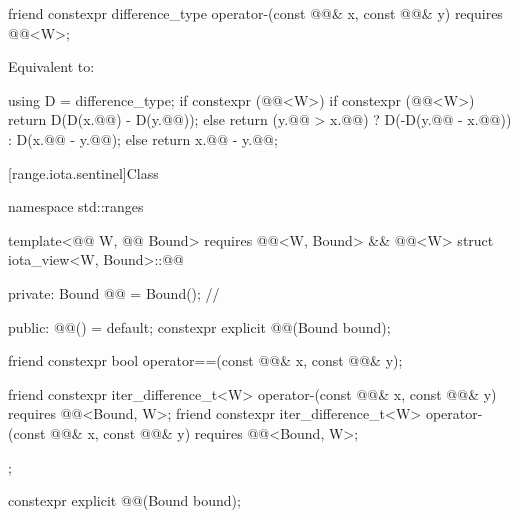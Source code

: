 \begin{itemdecl}
friend constexpr difference_type operator-(const @@& x, const @@& y)
  requires @@<W>;
\end{itemdecl}

\begin{itemdescr}
\pnum
\effects
Equivalent to:
\begin{codeblock}
using D = difference_type;
if constexpr (@@<W>) {
  if constexpr (@@<W>)
    return D(D(x.@@) - D(y.@@));
  else
    return (y.@@ > x.@@)
      ? D(-D(y.@@ - x.@@))
      : D(x.@@ - y.@@);
} else {
  return x.@@ - y.@@;
}
\end{codeblock}
\end{itemdescr}

[range.iota.sentinel]{Class }

%
\begin{codeblock}
namespace std::ranges {
  template<@@ W, @@ Bound>
    requires @@<W, Bound> && @@<W>
  struct iota_view<W, Bound>::@@ {
  private:
    Bound @@ = Bound();     // \expos

  public:
    @@() = default;
    constexpr explicit @@(Bound bound);

    friend constexpr bool operator==(const @@& x, const @@& y);

    friend constexpr iter_difference_t<W> operator-(const @@& x, const @@& y)
      requires @@<Bound, W>;
    friend constexpr iter_difference_t<W> operator-(const @@& x, const @@& y)
      requires @@<Bound, W>;
  };
}
\end{codeblock}

\begin{itemdecl}
constexpr explicit @@(Bound bound);
\end{itemdecl}

